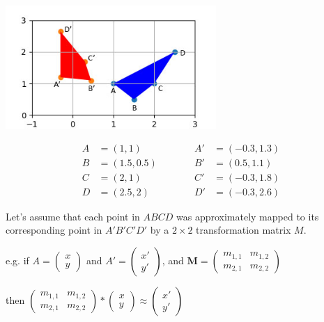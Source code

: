 \includegraphics[width=8cm]{quadrilaterals.jpg}

\begin{equation}
    \begin{split}
        A&=(1, 1)\\
        B&=(1.5, 0.5)\\
        C&=(2, 1)\\
        D&=(2.5, 2)
    \end{split}
    \quad\quad\quad
    \begin{split}
        A'&=(-0.3, 1.3)\\
        B'&=(0.5, 1.1)\\
        C'&=(-0.3, 1.8)\\
        D'&=(-0.3, 2.6)
    \end{split}
\end{equation}

Let's assume that each point in $ABCD$ was approximately mapped to its corresponding point in $A'B'C'D'$ by a $2\times2$ transformation matrix $M$.

e.g. if $A = \begin{pmatrix} x \\ y \end{pmatrix}$ and $A' = \begin{pmatrix} x' \\ y' \end{pmatrix}$, and $\boldsymbol{M} = \begin{pmatrix} m_{1,1} & m_{1,2} \\ m_{2,1} & m_{2,2} \end{pmatrix}$

then $\begin{pmatrix} m_{1,1} & m_{1,2} \\ m_{2,1} & m_{2,2} \end{pmatrix} * \begin{pmatrix} x \\ y \end{pmatrix} \approx \begin{pmatrix} x' \\ y' \end{pmatrix}$

